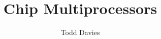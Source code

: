 \newcommand{\coursename}{Chip Multiprocessors}
\newcommand{\coursecode}{COMP35112}
\newcommand{\courseinfo}{}
\newcommand{\Author}{Todd Davies} 
\newcommand{\Title}{Chip Multiprocessors}
\author{\Author}
\title{\Title}
